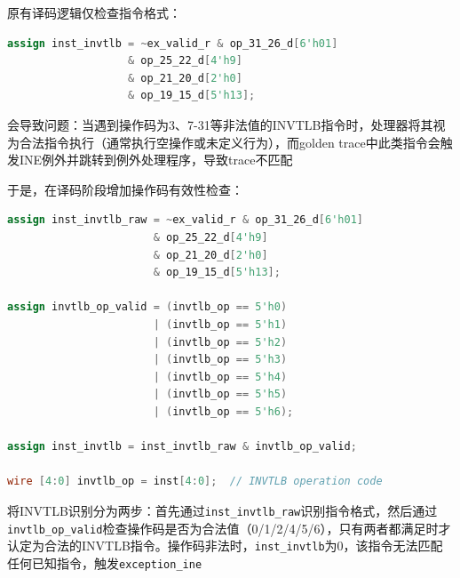 原有译码逻辑仅检查指令格式：

\begin{lstlisting}[language=Verilog]
assign inst_invtlb = ~ex_valid_r & op_31_26_d[6'h01] 
                   & op_25_22_d[4'h9] 
                   & op_21_20_d[2'h0] 
                   & op_19_15_d[5'h13];
\end{lstlisting}

会导致问题：当遇到操作码为3、7-31等非法值的INVTLB指令时，处理器将其视为合法指令执行（通常执行空操作或未定义行为），而golden trace中此类指令会触发INE例外并跳转到例外处理程序，导致trace不匹配

于是，在译码阶段增加操作码有效性检查：

\begin{lstlisting}[language=Verilog]
assign inst_invtlb_raw = ~ex_valid_r & op_31_26_d[6'h01] 
                       & op_25_22_d[4'h9] 
                       & op_21_20_d[2'h0] 
                       & op_19_15_d[5'h13];

assign invtlb_op_valid = (invtlb_op == 5'h0)
                       | (invtlb_op == 5'h1)
                       | (invtlb_op == 5'h2)
                       | (invtlb_op == 5'h3)
                       | (invtlb_op == 5'h4)
                       | (invtlb_op == 5'h5)
                       | (invtlb_op == 5'h6);

assign inst_invtlb = inst_invtlb_raw & invtlb_op_valid;

wire [4:0] invtlb_op = inst[4:0];  // INVTLB operation code
\end{lstlisting}

将INVTLB识别分为两步：首先通过\texttt{inst\_invtlb\_raw}识别指令格式，然后通过\texttt{invtlb\_op\_valid}检查操作码是否为合法值（0/1/2/4/5/6），只有两者都满足时才认定为合法的INVTLB指令。操作码非法时，\texttt{inst\_invtlb}为0，该指令无法匹配任何已知指令，触发\texttt{exception\_ine}

